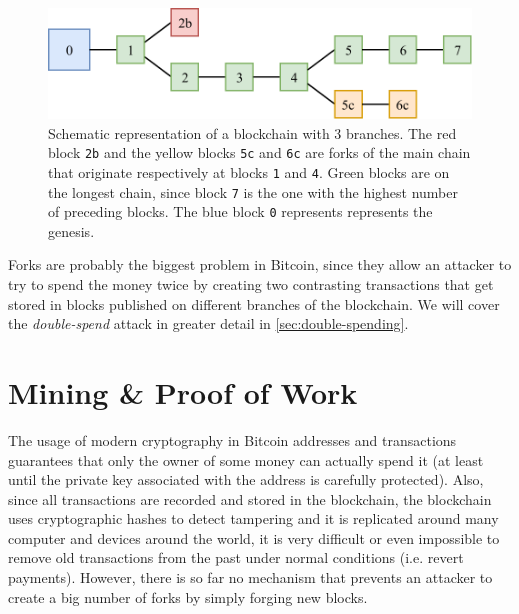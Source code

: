 \begin{figure}[ht]
	\centering
	\vspace*{0.25cm}
	\includegraphics[scale=0.9]{figures/forks}
	\vspace*{0.25cm}
	\caption[Schematic representation of a blockchain different branches]{
		Schematic representation of a blockchain with \num{3} branches.
		The red block \texttt{2b} and the yellow blocks \texttt{5c} and \texttt{6c} are forks of the main chain that originate respectively at blocks \texttt{1} and \texttt{4}.
		Green blocks are on the longest chain, since block \texttt{7} is the one with the highest number of preceding blocks.
		The blue block \texttt{0} represents represents the genesis.
	}
	\label{fig:forks}
\end{figure}

Forks are probably the biggest problem in Bitcoin, since they allow an attacker to try to spend the money twice by creating two contrasting transactions that get stored in blocks published on different branches of the blockchain.
We will cover the \textit{double-spend} attack in greater detail in \cref{sec:double-spending}.

\section{Mining \& Proof of Work}
\label{sec:mining}
The usage of modern cryptography in Bitcoin addresses and transactions guarantees that only the owner of some money can actually spend it (at least until the private key associated with the address is carefully protected).
Also, since all transactions are recorded and stored in the blockchain, the blockchain uses cryptographic hashes to detect tampering and it is replicated around many computer and devices around the world, it is very difficult or even impossible to remove old transactions from the past under normal conditions (i.e. revert payments).
However, there is so far no mechanism that prevents an attacker to create a big number of forks by simply forging new blocks.

